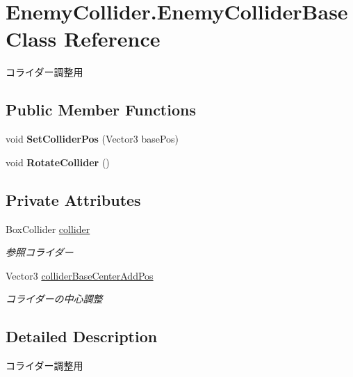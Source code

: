 \hypertarget{class_enemy_collider_1_1_enemy_collider_base}{}\section{Enemy\+Collider.\+Enemy\+Collider\+Base Class Reference}
\label{class_enemy_collider_1_1_enemy_collider_base}


コライダー調整用  


\subsection*{Public Member Functions}
\begin{DoxyCompactItemize}
\item 
\mbox{\label{class_enemy_collider_1_1_enemy_collider_base_aa27618ca2e648634940904e23080aca6}} 
void {\bfseries Set\+Collider\+Pos} (Vector3 base\+Pos)
\item 
\mbox{\label{class_enemy_collider_1_1_enemy_collider_base_ab93859eedb1205be207ff5259e149656}} 
void {\bfseries Rotate\+Collider} ()
\end{DoxyCompactItemize}
\subsection*{Private Attributes}
\begin{DoxyCompactItemize}
\item 
Box\+Collider \hyperlink{class_enemy_collider_1_1_enemy_collider_base_a7978e2baa8739c50fd0e1dc321522351}{collider}
\begin{DoxyCompactList}\small\item\em 参照コライダー \end{DoxyCompactList}\item 
Vector3 \hyperlink{class_enemy_collider_1_1_enemy_collider_base_aa78ee9841b7f165f3879020501a982b9}{collider\+Base\+Center\+Add\+Pos}
\begin{DoxyCompactList}\small\item\em コライダーの中心調整 \end{DoxyCompactList}\end{DoxyCompactItemize}


\subsection{Detailed Description}
コライダー調整用 



